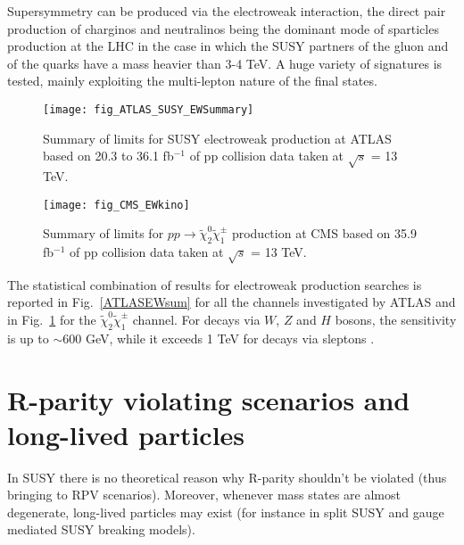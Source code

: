 \documentclass{ws-ijmpcs}
\begin{document}
Supersymmetry can be produced via the electroweak interaction, the direct pair production of charginos and neutralinos being the dominant mode of sparticles production at the LHC in the case in which the SUSY partners of the gluon and of the quarks have a mass heavier than 3-4 TeV.
A huge variety of signatures is tested, mainly exploiting the multi-lepton nature of the final states.

\begin{figure}[!tbp]
  \centering
  \begin{minipage}[b]{0.45\textwidth}
    \texttt{[image: fig\_ATLAS\_SUSY\_EWSummary]}
    \caption{Summary of limits for SUSY electroweak production at ATLAS based on 20.3 to 36.1 fb$^{-1}$ of pp collision data taken at $\sqrt{s}$ = 13 TeV. \label{ATLASEWsum}}
  \end{minipage}
  \hfill
  \begin{minipage}[b]{0.45\textwidth}
    \texttt{[image: fig\_CMS\_EWkino]}
    \caption{Summary of limits for $pp \rightarrow \tilde{\chi}^0_2 \tilde{\chi}^\pm_1$ production at CMS based on 35.9 fb$^{-1}$ of pp collision data taken at $\sqrt{s}$ = 13 TeV. \label{CMSEWsum}}
  \end{minipage}
\end{figure}

The statistical combination of results for electroweak production searches is reported in Fig.~\ref{ATLASEWsum} for all the channels investigated by ATLAS and in Fig.~\ref{CMSEWsum} for the $\tilde{\chi}^0_2 \tilde{\chi}^\pm_1$ channel.
For decays via $W$, $Z$ and $H$ bosons, the sensitivity is up to $\sim 600$ GeV, while it exceeds 1 TeV for decays via sleptons \cite{ATLASEW}.

\section{R-parity violating scenarios and long-lived particles}
In SUSY there is no theoretical reason why R-parity shouldn't be violated (thus bringing to RPV scenarios). Moreover, whenever mass states are almost degenerate, long-lived particles may exist (for instance in split SUSY and gauge mediated SUSY breaking models). 
\end{document}
